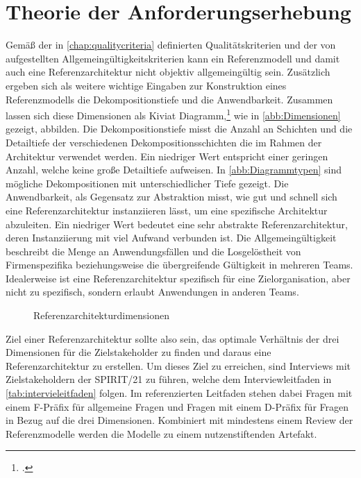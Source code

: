 \section{Theorie der Anforderungserhebung}\label{chap:requirements}

Gemäß der in \autoref{chap:qualitycriteria} definierten Qualitätskriterien und der von \citeauthor{vomBrocke.2003} aufgestellten Allgemeingültigkeitskriterien kann ein Referenzmodell und damit auch eine Referenzarchitektur nicht objektiv allgemeingültig sein. Zusätzlich ergeben sich als weitere wichtige Eingaben zur Konstruktion eines Referenzmodells die Dekompositionstiefe und die Anwendbarkeit. Zusammen lassen sich diese Dimensionen als Kiviat Diagramm,\footcite[Vgl.][33\psqq]{Kolence.1973} wie in \autoref{abb:Dimensionen} gezeigt, abbilden. Die Dekompositionstiefe misst die Anzahl an Schichten und die Detailtiefe der verschiedenen Dekompositionsschichten die im Rahmen der Architektur verwendet werden. Ein niedriger Wert entspricht einer geringen Anzahl, welche keine große Detailtiefe aufweisen. In \autoref{abb:Diagrammtypen} sind mögliche Dekompositionen mit unterschiedlicher Tiefe gezeigt. Die Anwendbarkeit, als Gegensatz zur Abstraktion misst, wie gut und schnell sich eine Referenzarchitektur instanziieren lässt, um eine spezifische Architektur abzuleiten. Ein niedriger Wert bedeutet eine sehr abstrakte Referenzarchitektur, deren Instanziierung mit viel Aufwand verbunden ist. Die Allgemeingültigkeit beschreibt die Menge an Anwendungsfällen und die Losgelöstheit von Firmenspezifika beziehungsweise die übergreifende Gültigkeit in mehreren Teams. Idealerweise ist eine Referenzarchitektur spezifisch für eine Zielorganisation, aber nicht zu spezifisch, sondern erlaubt Anwendungen in anderen Teams.

\begin{figure}[H]
\centering
{}

\caption{Referenzarchitekturdimensionen}
\label{abb:Dimensionen}
\end{figure}

Ziel einer Referenzarchitektur sollte also sein, das optimale Verhältnis der drei Dimensionen für die Zielstakeholder zu finden und daraus eine Referenzarchitektur zu erstellen. Um dieses Ziel zu erreichen, sind Interviews mit Zielstakeholdern der SPIRIT/21 zu führen, welche dem Interviewleitfaden in \autoref{tab:intervieleitfaden} folgen. Im referenzierten Leitfaden stehen dabei Fragen mit einem F-Präfix für allgemeine Fragen und Fragen mit einem D-Präfix für Fragen in Bezug auf die drei Dimensionen. Kombiniert mit mindestens einem Review der Referenzmodelle werden die Modelle zu einem nutzenstiftenden Artefakt.



